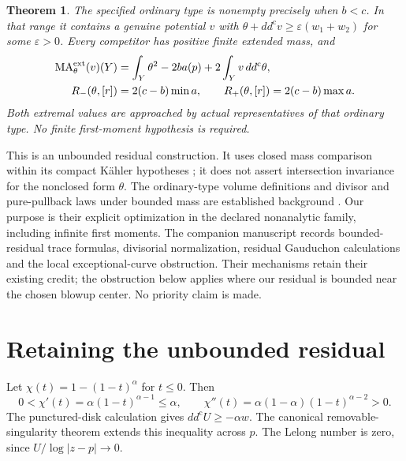\documentclass[11pt]{article}
\newtheorem{theorem}{Theorem}
\theoremstyle{remark}
\newcommand{\ddc}{dd^{\mathrm c}}
\newcommand{\MA}{\operatorname{MA}}
\begin{document}
\begin{theorem}\label{thm:mass}
The specified ordinary type is nonempty precisely when $b<c$. In that
range it contains a genuine potential $v$ with
$\theta+\ddc v\geq\varepsilon(w_1+w_2)$ for some $\varepsilon>0$.
Every competitor has positive finite extended mass, and
\begin{align}
 \MA^{\rm ext}_\theta(v)(Y)
   &=\int_Y\theta^2-2b a(p)+2\int_Yv\,\ddc\theta,\label{eq:affine}\\
 R_-(\theta,[r])&=2(c-b)\min a,\qquad
 R_+(\theta,[r])=2(c-b)\max a.\label{eq:extrema}
\end{align}
Both extremal values are approached by actual representatives of that
ordinary type. No finite first-moment hypothesis is required.
\end{theorem}

This is an unbounded residual construction. It uses closed mass comparison
within its compact K\"ahler hypotheses \cite{BEGZ}; it does not assert
intersection invariance for the nonclosed form $\theta$.
The ordinary-type volume definitions and divisor and pure-pullback laws
under bounded mass are established background
\cite[Definition~3.1 and Proposition~3.3]{BGL}. Our purpose is their explicit
optimization in the declared nonanalytic family, including infinite first
moments. The companion manuscript \cite{Companion} records bounded-residual
trace formulas, divisorial normalization, residual Gauduchon calculations
and the local exceptional-curve obstruction. Their mechanisms retain their
existing credit; the obstruction below applies where our residual is bounded
near the chosen blowup center. No priority claim is made.

\section{Retaining the unbounded residual}
Let $\chi(t)=1-(1-t)^\alpha$ for $t\leq0$. Then
\[
 0<\chi'(t)=\alpha(1-t)^{\alpha-1}\leq\alpha,
 \qquad \chi''(t)=\alpha(1-\alpha)(1-t)^{\alpha-2}>0.
\]
The punctured-disk calculation gives
$\ddc U\geq-\alpha w$. The canonical removable-singularity theorem
\cite[I.5.23--5.24]{Demailly} extends this inequality across $p$.
The Lelong number is zero, since $U/\log|z-p|\to0$.
\end{document}
